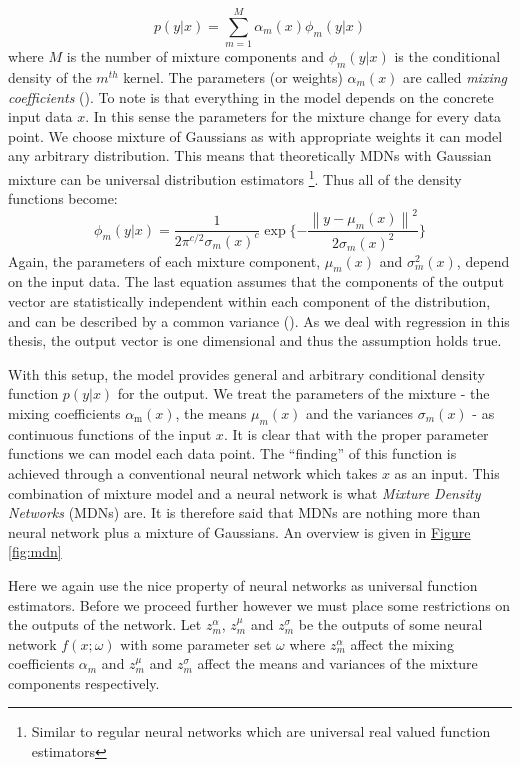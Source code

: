 \documentclass[12pt,a4paper,twoside]{scrartcl}
\numberwithin{equation}{section}
\newcommand{\reffig}[1]{\hyperref[#1]{Figure \ref*{#1}}}
\begin{document}
\begin{equation}
p(y|x)=\sum_{m=1}^M \alpha_m(x)\phi_m(y|x)
\end{equation}
where \(M\) is the number of mixture components and \(\phi_m(y|x)\) is the conditional density of the \(m^{th}\) kernel. The parameters (or weights) \(\alpha_m(x)\) are called \emph{mixing coefficients} (\cite{bishop1994}). To note is that everything in the model depends on the concrete input data \(x\). In this sense the parameters for the mixture change for every data point. We choose mixture of Gaussians as with appropriate weights it can model any arbitrary distribution. This means that theoretically MDNs with Gaussian mixture can be universal distribution estimators \footnote{Similar to regular neural networks which are universal real valued function estimators}. Thus all of the density functions become:
\begin{equation}
\phi_m(y|x) = \frac{1}{2\pi^{c/2}\sigma_m(x)^c}\exp\{-\frac{\left\lVert y - \mu_m(x) \right\rVert^2}{2\sigma_m(x)^2}\}
\end{equation}
Again, the parameters of each mixture component, \(\mu_m(x)\) and \(\sigma_m^2(x)\), depend on the input data. The last equation assumes that the components of the output vector are statistically independent within each component of the distribution, and can be described by a common variance (\cite{bishop1994}). As we deal with regression in this thesis, the output vector is one dimensional and thus the assumption holds true.

With this setup, the model provides general and arbitrary conditional density function \(p(y|x)\) for the output. We treat the parameters of the mixture - the mixing coefficients \(\alpha_{\text{m}}(x)\), the means \(\mu_m(x)\) and the variances \(\sigma_m(x)\) - as continuous functions of the input \(x\). It is clear that with the proper parameter functions we can model each data point. The ``finding'' of this function is achieved through a conventional neural network which takes \(x\) as an input. This combination of mixture model and a neural network is what \emph{Mixture Density Networks} (MDNs) are. It is therefore said that MDNs are nothing more than neural network plus a mixture of Gaussians. An overview is given in \reffig{fig:mdn}

Here we again use the nice property of neural networks as universal function estimators. Before we proceed further however we must place some restrictions on the outputs of the network. Let \(z_m^{\alpha}\), \(z_m^{\mu}\) and \(z_m^{\sigma}\) be the outputs of some neural network \(f(x;\omega)\) with some parameter set \(\omega\) where \(z_m^{\alpha}\) affect the mixing coefficients \(\alpha_m\) and \(z_m^{\mu}\) and \(z_m^{\sigma}\) affect the means and variances of the mixture components respectively.
\end{document}
